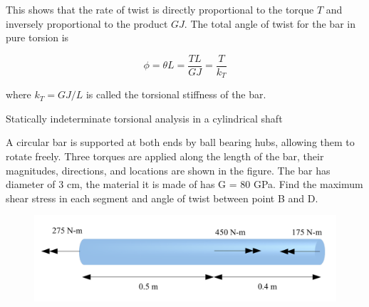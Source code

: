 \documentclass[
10pt,
a4paper,
openany,
svgnames,
]{book} %
\begin{document}
This shows that the rate of twist is directly proportional to the torque $T$ and inversely proportional to the product $GJ$. The total angle of twist for the bar in pure torsion is

\begin{equation}
  \phi  = \theta L = \frac{TL}{GJ} = \frac{T}{k_T}
\end{equation}

where $k_T = GJ/L$ is called the torsional stiffness of the bar.

\begin{example} Statically indeterminate torsional analysis in a cylindrical shaft
  
  A circular bar is supported at both ends by ball bearing hubs, allowing them to rotate freely. Three torques are applied along the length of the bar, their magnitudes, directions, and locations are shown in the figure. The bar has diameter of 3 cm, the material it is made of has G = 80 GPa. Find the maximum shear stress in each segment and angle of twist between point B and D.

  \begin{figure}[H]
  \centering
  \includegraphics[scale=0.75]{pictures/Static-body-load-analysis/torsion-problem}
\end{figure}
  
\end{example}
  
\end{document}
